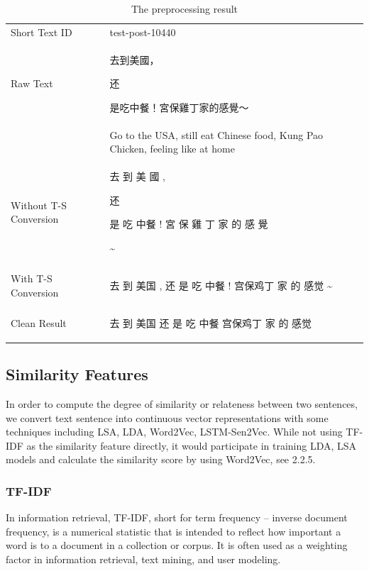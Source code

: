 \documentclass{sig-alternate}
\begin{document}
\begin{table}
\centering
\caption{The preprocessing result}
\begin{tabular}{l@{\qquad}l}
\hline\noalign{\smallskip}
Short Text ID & test-post-10440 \\
\noalign{\smallskip}
\hline
\noalign{\smallskip}
Raw Text          & \begin{CJK}{UTF8}{bsmi}去到美國，\begin{CJK}{UTF8}{gbsn}还\end{CJK}是吃中餐！宮保雞丁家的感覺～\end{CJK}  \\ 
 & Go to the USA, still eat Chinese food, Kung Pao Chicken, feeling like at home \\
\hline
\noalign{\smallskip}
Without T-S Conversion  & \begin{CJK}{UTF8}{bsmi}去 到 美 國 , \begin{CJK}{UTF8}{gbsn}还\end{CJK} 是 吃 中餐 ! 宮 保 雞 丁 家 的 感 覺 \end{CJK} \~{} \\
\hline
\noalign{\smallskip}
With T-S Conversion   & \begin{CJK}{UTF8}{gbsn}去 到 美国 , 还 是 吃 中餐 ! 宫保鸡丁 家 的 感觉 \~{}\end{CJK}   \\
\hline
\noalign{\smallskip}
Clean Result   & \begin{CJK}{UTF8}{gbsn}去 到 美国 还 是 吃 中餐 宫保鸡丁 家 的 感觉\end{CJK}   \\
\hline
\end{tabular}
\end{table}


\subsection{Similarity Features}
In order to compute the degree of similarity or relateness between two 
sentences, we convert text sentence into continuous vector representations 
with some techniques including LSA, LDA, Word2Vec, LSTM-Sen2Vec. While not 
using TF-IDF as the similarity feature directly, it would participate in 
training LDA, LSA models and calculate the similarity score by using Word2Vec, see 2.2.5.

\subsubsection{TF-IDF}
In information retrieval, TF-IDF, short for term frequency – inverse document frequency, is a numerical statistic that is intended to reflect how important a word is to a document in a collection or corpus. It is often used as a weighting factor in information retrieval, text mining, and user modeling. 
\end{document}

